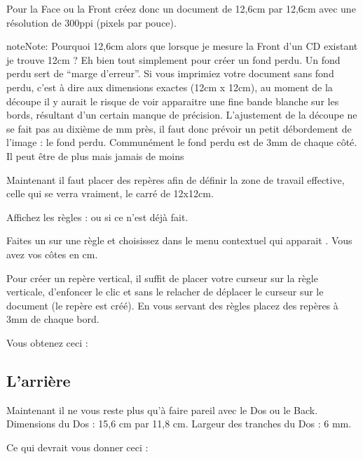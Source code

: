 \documentclass[a4paper,12pt,french]{sphinxmanual}
\begin{document}
Pour la Face ou la Front créez donc un document de 12,6cm par 12,6cm avec une résolution de 300ppi (pixels par pouce).

\begin{notice}{note}{Note:}
Pourquoi 12,6cm alors que lorsque je mesure la Front d'un CD existant je trouve 12cm ?
Eh bien tout simplement pour créer un fond perdu. Un fond perdu sert de ``marge d'erreur''. Si vous imprimiez votre document sans fond perdu, c'est à dire aux dimensions exactes (12cm x 12cm), au moment de la découpe il y aurait le risque de voir apparaitre une fine bande blanche sur les bords, résultant d'un certain manque de précision. L'ajustement de la découpe ne se fait pas au dixième de mm près, il faut donc prévoir un petit débordement de l'image : le fond perdu. Communément le fond perdu est de 3mm de chaque côté. Il peut être de plus mais jamais de moins
\end{notice}

Maintenant il faut placer des repères afin de définir la zone de travail effective, celle qui se verra vraiment, le carré de 12x12cm.

Affichez les règles :  ou  si ce n'est déjà fait.

Faites un  sur une règle et choisissez dans le menu contextuel qui apparait . Vous avez vos côtes en cm.

Pour créer un repère vertical, il suffit de placer votre curseur sur la règle verticale, d'enfoncer le clic et sans le relacher de déplacer le curseur sur le document (le repère est créé). En vous servant des règles placez des repères à 3mm de chaque bord.

Vous obtenez ceci :

\noindent{}


\subsection{L'arrière}
\label{psd/jaquette_CD:l-arriere}
Maintenant il ne vous reste plus qu'à faire pareil avec le Dos ou le Back. Dimensions du Dos : 15,6 cm par 11,8 cm. Largeur des tranches du Dos : 6 mm.

Ce qui devrait vous donner ceci :

\noindent{}
\end{document}
